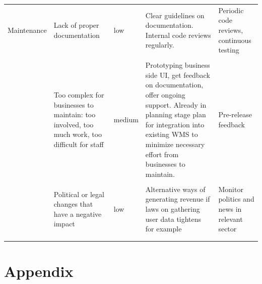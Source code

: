 \documentclass[titlepage]{article}
\begin{document}
\begin{center}
\begin{longtable}{p{2.1cm}|p{3.5cm}p{1.2cm}p{3.5cm}p{1.7cm}}
Maintenance &  Lack of proper documentation & low & Clear guidelines on documentation. Internal code reviews regularly. & Periodic code reviews, continuous testing \\
\\
& Too complex for businesses to maintain: too involved, too much work, too difficult for staff & medium & Prototyping business side UI, get feedback on documentation, offer ongoing support. Already in planning stage plan for integration into existing WMS to minimize necessary effort from businesses to maintain. & Pre-release feedback \\
\\
& Political or legal changes that have a negative impact & low & Alternative ways of generating revenue if laws on gathering user data tightens for example & Monitor politics and news in relevant sector \\
\\
\hline
\label{risktable}
\end{longtable}
\normalsize
\end{center}

\section{Appendix}
\end{document}
